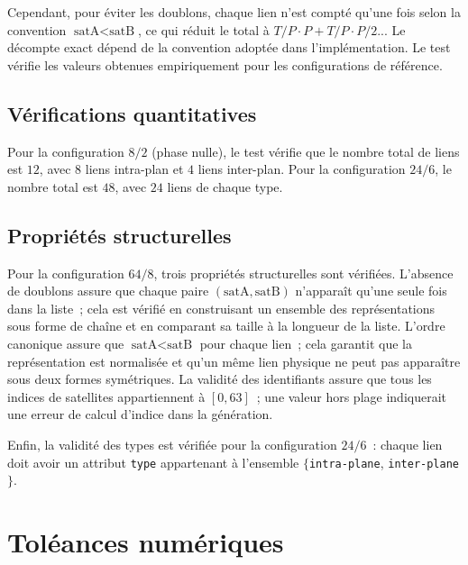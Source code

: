 \documentclass[12pt,a4paper]{article}
\begin{document}
Cependant, pour éviter les doublons, chaque lien n'est compté qu'une fois selon la convention $\text{satA} < \text{satB}$, ce qui réduit le total à $T/P \cdot P + T/P \cdot P / 2$... Le décompte exact dépend de la convention adoptée dans l'implémentation. Le test vérifie les valeurs obtenues empiriquement pour les configurations de référence.

\subsection{Vérifications quantitatives}

Pour la configuration $8/2$ (phase nulle), le test vérifie que le nombre total de liens est $12$, avec $8$ liens intra-plan et $4$ liens inter-plan. Pour la configuration $24/6$, le nombre total est $48$, avec $24$ liens de chaque type.

\subsection{Propriétés structurelles}

Pour la configuration $64/8$, trois propriétés structurelles sont vérifiées. L'absence de doublons assure que chaque paire $(\text{satA}, \text{satB})$ n'apparaît qu'une seule fois dans la liste~; cela est vérifié en construisant un ensemble des représentations sous forme de chaîne et en comparant sa taille à la longueur de la liste. L'ordre canonique assure que $\text{satA} < \text{satB}$ pour chaque lien~; cela garantit que la représentation est normalisée et qu'un même lien physique ne peut pas apparaître sous deux formes symétriques. La validité des identifiants assure que tous les indices de satellites appartiennent à $[0, 63]$~; une valeur hors plage indiquerait une erreur de calcul d'indice dans la génération.

Enfin, la validité des types est vérifiée pour la configuration $24/6$~: chaque lien doit avoir un attribut \texttt{type} appartenant à l'ensemble $\{$\texttt{intra-plane}, \texttt{inter-plane}$\}$.

\section{Toléances numériques}
\end{document}
